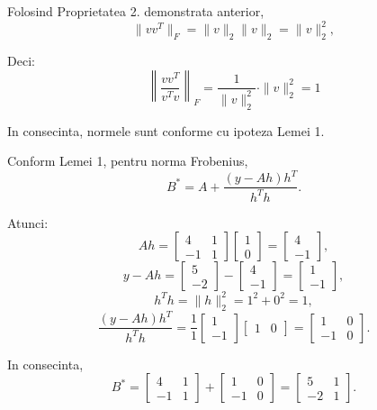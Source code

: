 \begin{demonstratie}
    Folosind Proprietatea 2. demonstrata anterior, 
    $$ \|v v^T\|_F = \|v\|_2 \|v\|_2 = \|v\|_2^2, $$

    Deci:
    $$ \left\| \frac{vv^T}{v^T v} \right\|_F = \frac{1}{\|v\|_2^2} \cdot \|v\|_2^2 = 1 $$

    In consecinta, normele sunt conforme cu ipoteza Lemei 1.

    \bigskip

    Conform Lemei 1, pentru norma Frobenius, 
    $$ B^* = A + \frac{(y - Ah)h^T}{h^T h}. $$

    Atunci:
    $$ Ah = \begin{bmatrix} 4 & 1 \\ -1 & 1 \end{bmatrix} \begin{bmatrix} 1 \\ 0 \end{bmatrix} = \begin{bmatrix} 4 \\ -1 \end{bmatrix}, $$
    $$ y - Ah = \begin{bmatrix} 5 \\ -2 \end{bmatrix} - \begin{bmatrix} 4 \\ -1 \end{bmatrix} = \begin{bmatrix} 1 \\ -1 \end{bmatrix}, $$
    $$ h^T h = \|h\|_2^2 = 1^2 + 0^2 = 1, $$
    $$ \frac{(y - Ah)h^T}{h^T h} = \frac{1}{1} \begin{bmatrix} 1 \\ -1 \end{bmatrix} \begin{bmatrix} 1 & 0 \end{bmatrix} = \begin{bmatrix} 1 & 0 \\ -1 & 0 \end{bmatrix}. $$

    In consecinta,
    $$ B^* = \begin{bmatrix} 4 & 1 \\ -1 & 1 \end{bmatrix} + \begin{bmatrix} 1 & 0 \\ -1 & 0 \end{bmatrix} = \begin{bmatrix} 5 & 1 \\ -2 & 1 \end{bmatrix}. $$

\end{demonstratie}